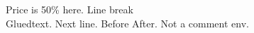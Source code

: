 \documentclass{article}
\begin{document}
Price is 50\% here. Line break\\Gluedtext.
Next line.
Before After.
Not a comment env.
\end{document}

